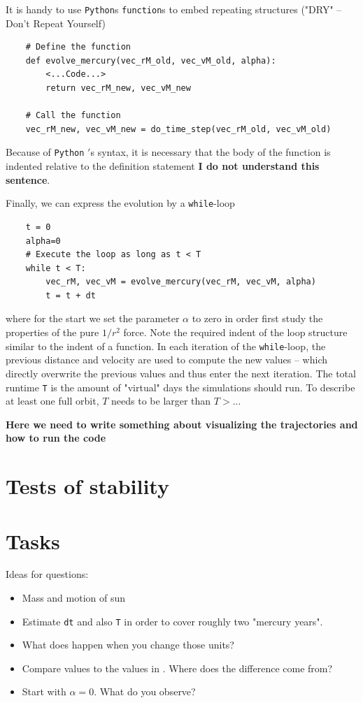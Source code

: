 \documentclass[12pt]{iopart}
\newcommand{\python}[0]{\texttt{Python} }
\begin{document}
It is handy to use \texttt{Python}s \texttt{function}s to embed repeating structures ("DRY" -- Don't Repeat Yourself)
\begin{lstlisting}
	# Define the function
	def evolve_mercury(vec_rM_old, vec_vM_old, alpha):
		<...Code...>
		return vec_rM_new, vec_vM_new
	
	# Call the function
	vec_rM_new, vec_vM_new = do_time_step(vec_rM_old, vec_vM_old)
\end{lstlisting}
Because of \python{$\!'$}s syntax, it is necessary that the body of the function is indented relative to the definition statement {\bf I do not understand this sentence}.

Finally, we can express the evolution by a \texttt{while}-loop
\begin{lstlisting}
	t = 0
	alpha=0
	# Execute the loop as long as t < T
	while t < T:
		vec_rM, vec_vM = evolve_mercury(vec_rM, vec_vM, alpha)
		t = t + dt
\end{lstlisting}
where for the start we set the parameter $\alpha$ to zero in order first study the properties of the pure 
$1/r^2$ force.
Note the required indent of the loop structure similar to the indent of a function.
In each iteration of the \texttt{while}-loop, the previous distance and velocity are used to compute the new values -- which directly overwrite the previous values and thus enter the next iteration.  The total runtime \texttt{T} is the amount of "virtual" days the simulations should run.
To describe at least one full orbit, $T$ needs to be larger than $T>..$.

{\bf Here we need to write something about visualizing the trajectories and how to run the code }

\section{Tests of stability}

\section{Tasks}


Ideas for questions:
\begin{itemize}
	\item Mass and motion of sun
	\item Estimate \texttt{dt} and also \texttt{T} in order to cover roughly two "mercury years".
	\item What does happen when you change those units?
	\item Compare values to the values in \cite{}.  Where does the difference come from?
	\item Start with $\alpha=0$. What do you observe?
\end{itemize}
\end{document}
